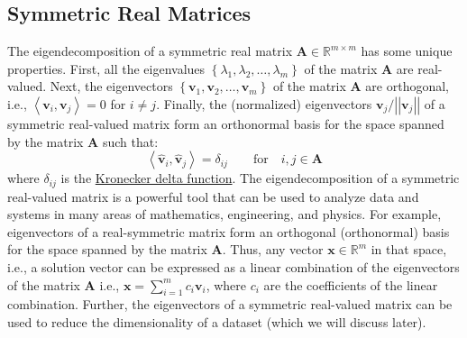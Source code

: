 \documentclass{article}[11pt]
\newcommand{\norm}[1]{\left|\left|#1\right|\right|}
\begin{document}
\subsection{Symmetric Real Matrices}
The eigendecomposition of a symmetric real matrix $\mathbf{A}\in\mathbb{R}^{m\times{m}}$ has some unique properties. 
First, all the eigenvalues $\left\{\lambda_{1},\lambda_{2},\dots,\lambda_{m}\right\}$ of the matrix $\mathbf{A}$ are real-valued.
Next, the eigenvectors $\left\{\mathbf{v}_{1},\mathbf{v}_{2},\dots,\mathbf{v}_{m}\right\}$ of the matrix $\mathbf{A}$ are orthogonal, i.e., $\left<\mathbf{v}_{i},\mathbf{v}_{j}\right> = 0$ for $i\neq{j}$.
Finally, the (normalized) eigenvectors $\mathbf{v}_{j}/\norm{\mathbf{v}_{j}}$ of a symmetric real-valued matrix 
form an orthonormal basis for the space spanned by the matrix $\mathbf{A}$ such that:
\begin{equation}
\left<\hat{\mathbf{v}}_{i},\hat{\mathbf{v}}_{j}\right> = \delta_{ij}\qquad\text{for}\quad{i,j\in\mathbf{A}}
\end{equation}
where $\delta_{ij}$ is the \href{https://en.wikipedia.org/wiki/Kronecker_delta}{Kronecker delta function}. The eigendecomposition of a symmetric real-valued matrix is a powerful tool that can be used to analyze data and systems in many areas of mathematics, engineering, and physics. For example, eigenvectors of a real-symmetric matrix form an orthogonal (orthonormal) basis for the space spanned by the matrix $\mathbf{A}$. Thus, any vector $\mathbf{x}\in\mathbb{R}^{m}$  in that space, i.e., a solution vector can be expressed as a linear combination of the eigenvectors of the matrix $\mathbf{A}$
i.e., $\mathbf{x} = \sum_{i=1}^{m}c_{i}\mathbf{v}_{i}$, where $c_{i}$ are the coefficients of the linear combination.
Further, the eigenvectors of a symmetric real-valued matrix can be used to reduce the dimensionality of a dataset (which we will discuss later).
\end{document}
